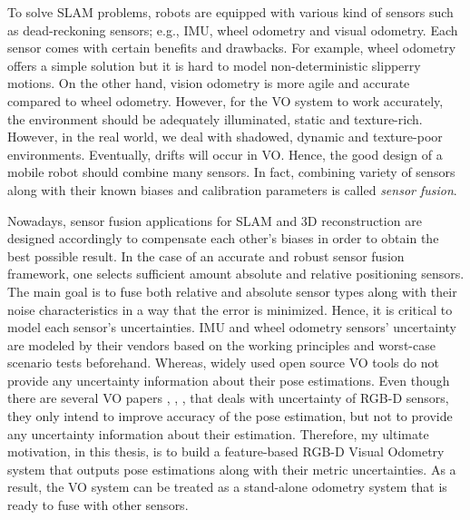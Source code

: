 \documentclass[a4paper]{report}
\numberwithin{figure}{section}
\begin{document}
To solve SLAM problems, robots are equipped with various kind of sensors 
such as 
dead-reckoning sensors; e.g., IMU, wheel odometry and visual odometry. 
Each sensor comes with certain benefits and drawbacks. For example, 
wheel odometry offers a simple solution but 
it is hard to model non-deterministic slipperry motions. 
On the other hand, vision odometry is more agile and accurate compared to 
wheel odometry. However, 
for the VO system to work
accurately, the environment should be adequately illuminated, static and
texture-rich.  However, in the real world, we deal with shadowed, dynamic and
texture-poor environments. Eventually, drifts will occur in VO. 
Hence, the good
design of a mobile robot should combine many sensors.
In fact, combining variety of sensors 
along with their known biases and calibration parameters is called 
\textit{sensor fusion}.

Nowadays, sensor fusion applications for SLAM and 3D reconstruction are designed 
accordingly to compensate each other's biases in order to obtain the best 
possible result. In the case of an accurate and robust sensor fusion framework, 
one selects sufficient amount absolute and relative positioning sensors. 
The main goal is to fuse both relative and absolute sensor types 
along with their noise characteristics in a way that the error is minimized. 
Hence, it is critical to model each sensor's uncertainties. 
IMU and wheel odometry sensors' uncertainty are modeled by their vendors 
based on the working principles and worst-case scenario tests beforehand.
Whereas, widely used open source VO tools do not provide any uncertainty information 
about their pose estimations. Even though there are several VO papers 
\parencite{Endres2014}, \parencite{Konolige08}, \parencite{Di2016a}, 
\parencite{Belter2018a}
that deals with uncertainty of RGB-D sensors, they only intend to 
improve accuracy of the pose estimation, but not to provide any uncertainty 
information about their estimation. Therefore, my ultimate motivation, in this thesis, is to build 
a feature-based RGB-D Visual Odometry system that outputs pose estimations 
along with their metric uncertainties.
As a result, the VO system can be treated as a stand-alone 
odometry system that is ready to fuse with other sensors.
\end{document}
